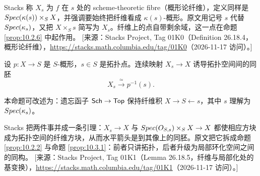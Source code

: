 \begin{yizhu}
Stacks 称 $X_s$ 为 $f$ 在 $s$ 处的 scheme-theoretic fibre（概形论纤维），定义同样是 $Spec(\kappa(s)) \times_S X$，并强调要始终把纤维看成 $\kappa(s)$-概形。原文用记号 $s$ 代替 $Spec(\kappa_s)$，又把 $X \times_S s$ 简写为 $X_s$。纤维上的点自带剩余域，这一点在命题 \ref{prop:10.2.6} 中起作用。
[来源：Stacks Project, Tag 01K0（Definition 26.18.4，概形论纤维），\url{https://stacks.math.columbia.edu/tag/01K0}（2026-11-17 访问）。]
\end{yizhu}

\begin{proposition}\label{prop:10.2.2}
设 $p \colon X \to S$ 是 $S$-概形，$s \in S$ 是拓扑点。连续映射 $X_s \to X$ 诱导拓扑空间间的同胚
\[
X_s \xrightarrow{\ \simeq\ } p^{-1}(s).
\]
\end{proposition}

\begin{remark}\label{rem:10.2.3}
本命题可改述为：遗忘函子 $\mathsf{Sch} \to \mathsf{Top}$ 保持纤维积 $X \to S \leftarrow s$，其中 $s$ 理解为 $Spec(\kappa_s)$。
\end{remark}

\begin{yizhu}
Stacks 把两件事并成一条引理：$X_s \to X$ 与 $Spec(O_{S,s}) \times_S X \to X$ 都使相应方块成为拓扑空间的纤维方块，从而水平箭头是到其像上的同胚。原文把它拆成命题 \ref{prop:10.2.2} 与命题 \ref{prop:10.3.1}：前者只讲拓扑，后者升级为局部环化空间之间的同构。
[来源：Stacks Project, Tag 01K1（Lemma 26.18.5，纤维与局部化处的基变换），\url{https://stacks.math.columbia.edu/tag/01K1}（2026-11-17 访问）。]
\end{yizhu}

